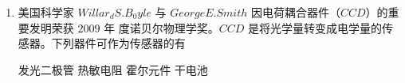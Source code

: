 
\begin{enumerate}
	\item
{}
美国科学家 $ Willa r_{d} S. B_{0} yle $ 与 $ GeorgeE.Smith $ 因电荷耦合器件（$ CCD $）的重要发明荣获 $ 2009 $ 年
度诺贝尔物理学奖。$ CCD $ 是将光学量转变成电学量的传感器。下列器件可作为传感器的有  

\fourchoices
{发光二极管}
{热敏电阻}
{霍尔元件}
{干电池}



	
	
	
\end{enumerate}

